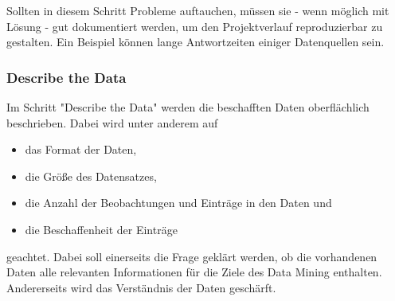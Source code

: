 Sollten in diesem Schritt Probleme auftauchen, müssen sie - wenn möglich mit Lösung - gut dokumentiert werden, um den Projektverlauf reproduzierbar zu gestalten. Ein Beispiel können lange Antwortzeiten einiger Datenquellen sein.\citep[S.~15]{shearer_crisp-dm_2000}

\subsubsection{Describe the Data}
Im Schritt "Describe the Data" werden die beschafften Daten oberflächlich beschrieben.\citep[S.~18]{chapman_crisp-dm_2000} Dabei wird unter anderem auf 
\begin{itemize}
\item das Format der Daten,
\item die Größe des Datensatzes,
\item die Anzahl der Beobachtungen und Einträge in den Daten und 
\item die Beschaffenheit der Einträge
\end{itemize}
geachtet. Dabei soll einerseits die Frage geklärt werden, ob die vorhandenen Daten alle relevanten Informationen für die Ziele des Data Mining enthalten. Andererseits wird das Verständnis der Daten geschärft.\citep[S.~15]{shearer_crisp-dm_2000}

